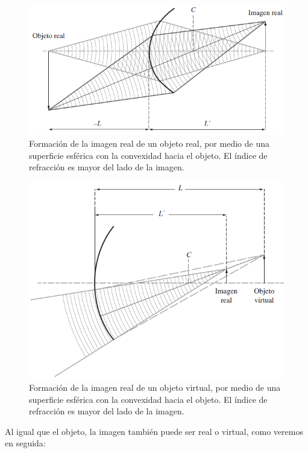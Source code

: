 \documentclass[14pt]{extarticle}
\begin{document}
\begin{figure}[H]
    \centering
    \includegraphics[scale=0.75]{Imagenes/Optica_Geometrica_09.png}
    \caption{Formación de la imagen real de un objeto real, por medio de una superficie esférica con la convexidad hacia el objeto. El índice de refracción es mayor del lado de la imagen.}
    \label{fig:figura_13}
\end{figure}
\begin{figure}[H]
    \centering
    \includegraphics[scale=0.75]{Imagenes/Optica_Geometrica_10.png}
    \caption{Formación de la imagen real de un objeto virtual, por medio de una superficie esférica con la convexidad hacia el objeto. El índice de refracción es mayor del lado de la imagen.}
    \label{fig:figura_14}
\end{figure}
Al igual que el objeto, la imagen también puede ser real o virtual, como veremos en seguida:
\end{document}
